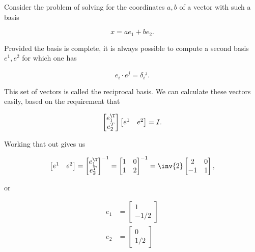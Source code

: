 Consider the problem of solving for the coordinates $a,b$ of a vector with such a basis

\begin{equation}\label{eqn:grahamSchmidtLorentz:110}
x = a e_1 + b e_2.
\end{equation}

Provided the basis is complete, it is always possible to compute a second basis ${e^1, e^2}$ for which one has

\begin{equation}\label{eqn:grahamSchmidtLorentz:130}
e_i \cdot e^j = {\delta_i}^j.
\end{equation}

This set of vectors is called the reciprocal basis.  We can calculate these vectors easily, based on the requirement that

\begin{equation}\label{eqn:grahamSchmidtLorentz:150}
\begin{bmatrix}
e_1^\T \\
e_2^T
\end{bmatrix}
\begin{bmatrix}
e^1 & e^2
\end{bmatrix} = I.
\end{equation}

Working that out gives us

\begin{equation}\label{eqn:grahamSchmidtLorentz:170}
\begin{bmatrix}
e^1 & e^2
\end{bmatrix}
=
{
\begin{bmatrix}
e_1^\T \\
e_2^T
\end{bmatrix}
}^{-1}
= 
{\begin{bmatrix}
1 & 0 \\
1 & 2
\end{bmatrix}}^{-1}
= 
\inv{2} 
\begin{bmatrix}
2 & 0 \\
-1 & 1
\end{bmatrix},
\end{equation}

or

\begin{equation}\label{eqn:grahamSchmidtLorentz:190}
\begin{aligned}
e_1 &= 
\begin{bmatrix}
1 \\
-1/2
\end{bmatrix} \\
e_2 &= 
\begin{bmatrix}
0 \\
1/2
\end{bmatrix} 
\end{aligned}
\end{equation}

